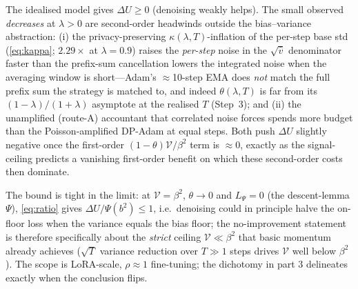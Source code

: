 \begin{remark}\label{rem:headwind}
The idealised model gives $\Delta U\ge0$ (denoising weakly helps). The small observed
\emph{decreases} at $\lambda>0$ are second-order headwinds outside the bias--variance abstraction:
(i) the privacy-preserving $\kappa(\lambda,T)$-inflation of the per-step base std
(\eqref{eq:kappa}; $2.29\times$ at $\lambda{=}0.9$) raises the \emph{per-step} noise in the
$\sqrt{\hat v}$ denominator faster than the prefix-sum cancellation lowers the integrated noise when
the averaging window is short---Adam's $\approx$10-step EMA does \emph{not} match the full prefix
sum the strategy is matched to, and indeed $\theta(\lambda,T)$ is far from its $(1-\lambda)/(1+\lambda)$
asymptote at the realised $T$ (Step~3); and (ii) the unamplified (route-A) accountant that
correlated noise forces spends more budget than the Poisson-amplified DP-Adam at equal steps. Both
push $\Delta U$ slightly negative once the first-order $(1-\theta)\mathcal V/\beta^2$ term is
$\approx0$, exactly as the signal-ceiling predicts a vanishing first-order benefit on which these
second-order costs then dominate.
\end{remark}

\begin{remark}\label{rem:scope}
The bound is tight in the limit: at $\mathcal V=\beta^2$, $\theta\to0$ and $L_\Psi=0$ (the
descent-lemma $\Psi$), \eqref{eq:ratio} gives $\Delta U/\Psi(b^2)\le1$, i.e.\ denoising could in
principle halve the on-floor loss when the variance equals the bias floor; the no-improvement
statement is therefore specifically about the \emph{strict} ceiling $\mathcal V\ll\beta^2$ that
basic momentum already achieves ($\sqrt T$ variance reduction over $T\gg1$ steps drives $\mathcal V$
well below $\beta^2$). The scope is LoRA-scale, $\rho\approx1$ fine-tuning; the dichotomy in part 3
delineates exactly when the conclusion flips.
\end{remark}